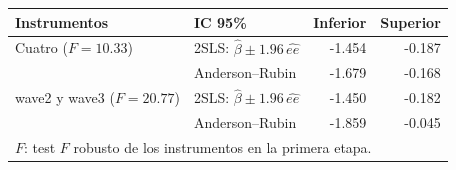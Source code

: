 
\begin{tabular}{llrr}
\toprule
Instrumentos & IC 95\% & Inferior & Superior\\
\midrule
Cuatro ($F=10.33$) & 2SLS: $\hat\beta\pm 1.96\,\widehat{ee}$ & -1.454 & -0.187\\
 & Anderson--Rubin & -1.679 & -0.168\\
wave2 y wave3 ($F=20.77$) & 2SLS: $\hat\beta\pm 1.96\,\widehat{ee}$ & -1.450 & -0.182\\
 & Anderson--Rubin & -1.859 & -0.045\\
\midrule
\multicolumn{4}{l}{$F$: test $F$ robusto de los instrumentos en la primera etapa.}\\
\bottomrule
\end{tabular}
